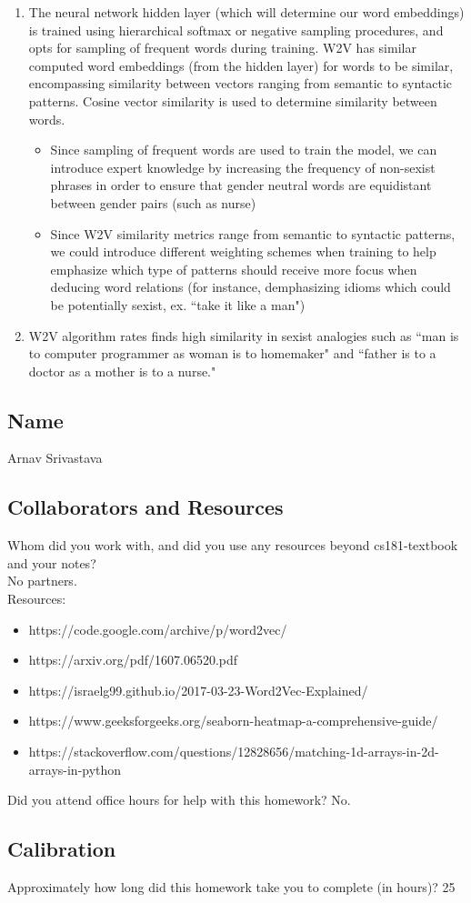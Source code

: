 \documentclass[submit]{harvardml}
\begin{document}
\begin{enumerate}
\begin{itemize}
    \end{itemize}
    \item The neural network hidden layer (which will determine our word embeddings) is trained using hierarchical softmax or negative sampling procedures, and opts for sampling of frequent words during training. W2V has similar computed word embeddings (from the hidden layer) for words to be similar, encompassing similarity between vectors ranging from semantic to syntactic patterns. Cosine vector similarity is used to determine similarity between words.
    \begin{itemize}
        \item Since sampling of frequent words are used to train the model, we can introduce expert knowledge by increasing the frequency of non-sexist phrases in order to ensure that gender neutral words are equidistant between gender pairs (such as nurse) 
        \item Since W2V similarity metrics range from semantic to syntactic patterns, we could introduce different weighting schemes when training to help emphasize which type of patterns should receive more focus when deducing word relations (for instance, demphasizing idioms which could be potentially sexist, ex. ``take it like a man")
    \end{itemize}
    \item W2V algorithm rates finds high similarity in sexist analogies such as ``man is to
computer programmer as woman is to homemaker" and ``father is to a doctor as a mother is to a nurse."

\end{enumerate}
\newpage
\subsection*{Name}
Arnav Srivastava
\subsection*{Collaborators and Resources}
Whom did you work with, and did you use any resources beyond cs181-textbook and your notes?\\
No partners.
\\
Resources:
\begin{itemize}
    \item https://code.google.com/archive/p/word2vec/
    \item https://arxiv.org/pdf/1607.06520.pdf
    \item https://israelg99.github.io/2017-03-23-Word2Vec-Explained/ 
    \item https://www.geeksforgeeks.org/seaborn-heatmap-a-comprehensive-guide/
    \item https://stackoverflow.com/questions/12828656/matching-1d-arrays-in-2d-arrays-in-python
\end{itemize}
Did you attend office hours for help with this homework?
No.
\subsection*{Calibration}
Approximately how long did this homework take you to complete (in hours)? 
25
\end{document}
